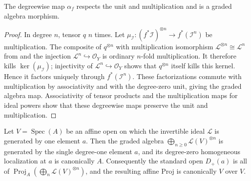 \begin{lemma}
  \label{lemma:nagata-blowup-universal-graded-map}

  The degreewise map $\alpha_f$ respects the unit and multiplication and is a
  graded algebra morphism.
\end{lemma}

\begin{proof}
  In degree $n$, tensor $q$ $n$ times.  Let
  $\mu_{\mathcal I}\colon(f^*\mathcal I)^{\otimes n}\to
  f^*(\mathcal I^n)$ be multiplication.  The composite of $q^{\otimes n}$
  with
  multiplication isomorphism
  $\mathcal L^{\otimes n}\cong\mathcal L^n$ from
   and the injection
  $\mathcal L^n\hookrightarrow\mathcal O_Y$ is ordinary $n$-fold
  multiplication.  It therefore kills $\ker(\mu_{\mathcal I})$; injectivity
  of $\mathcal L^n\hookrightarrow\mathcal O_Y$ shows that $q^{\otimes n}$
  itself kills this kernel.  Hence it factors uniquely through
  $f^*(\mathcal I^n)$.  These factorizations commute with multiplication by
  associativity and with the degree-zero unit, giving the graded algebra map.
  Associativity of tensor products and the multiplication maps for ideal
  powers show that these degreewise maps preserve the unit and multiplication.
\end{proof}

\begin{lemma}
  \label{lemma:nagata-relative-proj-invertible-tensor-powers-affine}

  Let $V=\operatorname{Spec}(A)$ be an affine open on which the invertible
  ideal $\mathcal L$ is generated by one element $a$.  Then the graded
  algebra $\bigoplus_{n\geq0}\mathcal L(V)^{\otimes n}$ is generated by the
  single degree-one element $a$, and its degree-zero homogeneous localization
  at $a$ is canonically $A$.  Consequently the standard open $D_+(a)$ is all
  of $\operatorname{Proj}_A(\bigoplus_n\mathcal L(V)^{\otimes n})$, and the
  resulting affine Proj is canonically $V$ over $V$.
\end{lemma}

